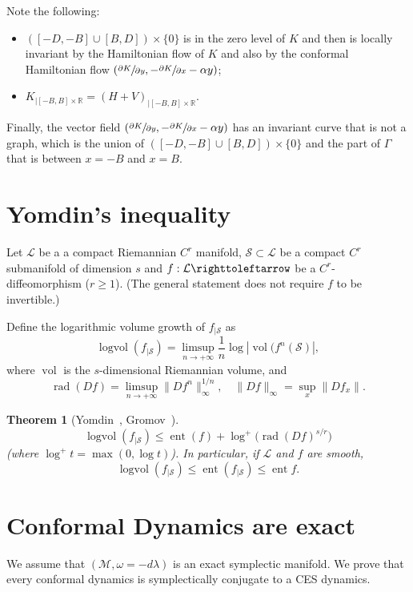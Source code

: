 \documentclass[10pt]{amsart}
\newtheorem{theorem}{Theorem}
\theoremstyle{definition}
\def\R{\mathbb{R}}
\def\cL{{\mathcal L}}
\def\cM{{\mathcal M}}
\def\cS{{\mathcal S}}
\DeclareMathOperator{\ent}{ent}
\DeclareMathOperator\logvol{logvol}
\DeclareMathOperator\rad{rad}
\DeclareMathOperator\vol{vol}
\providecommand{\skpt}{\par\smallskip\noindent}
\begin{document}
Note the following:
\begin{itemize}
\item $([-D, -B]\cup[B, D])\times\{ 0\}$ is in the zero level of $K$ and then is locally inva\-riant by the Hamiltonian flow of $K$ and also by the conformal Hamiltonian flow \hbox{$(\sfrac{\partial K}{\partial y}, -\sfrac{\partial K}{\partial x}-\alpha y)$};
\item $K_{|[-B, B]\times \R}=(H+V)_{|[-B, B]\times \R}$.
\end{itemize}
Finally, the vector field $(\sfrac{\partial K}{\partial y}, -\sfrac{\partial K}{\partial x}-\alpha y)$ has an invariant curve that is not a graph, which is the union of $([-D, -B]\cup[B, D])\times\{ 0\}$ and the part of $\Gamma$ that is between $x=-B$ and $x=B$.

\appendix

\section{Yomdin's inequality}
\label{AYomdin}

Let $\cL$ be a a compact Riemannian $C^r$ manifold, $\cS \subset \cL$ be a compact $C^r$ submanifold of dimension $s$ and $f : \cL \righttoleftarrow$ be a { $C^r$-diffeomorphism} ($r \geq 1$). (The general statement does not require $f$ to be invertible.)

Define the logarithmic volume growth of $f_{|\cS}$ as
\[
\logvol(f_{|\cS}) = \limsup_{n \to +\infty} \frac{1}{n} \log | \vol(f^{n}(\cS)|,
\]
where $\vol$ is the $s$-dimensional Riemannian volume, and
\[
\rad (Df) = \limsup_{n \to +\infty} \|Df^n\|_\infty^{1/n}, \quad \|Df\|_\infty = \sup_x \|Df_x\|.
\]

\skpt\begin{theorem}[Yomdin~\cite{Yom1987}, Gromov~\cite{Gromov1987}]\mbox{}\vspace*{-\baselineskip}
\[
\logvol (f_{|\cS}) \leq \ent (f) + \log^+\bigl(\rad(Df)^{s/r}\bigr)
\]
(where $\log^+ t = \max (0, \log t)$). In particular, if $\cL$ and $f$ are smooth,
\[
\logvol (f_{|\cS}) \leq \ent (f_{|\cS}) \leq \ent f.
\]
\end{theorem}

\section{Conformal Dynamics are exact} \label{Aconfexact}

We assume that $(\cM, \omega=-d\lambda)$ is an exact symplectic manifold. We prove that every conformal dynamics is symplectically conjugate to a CES dynamics.
\end{document}
